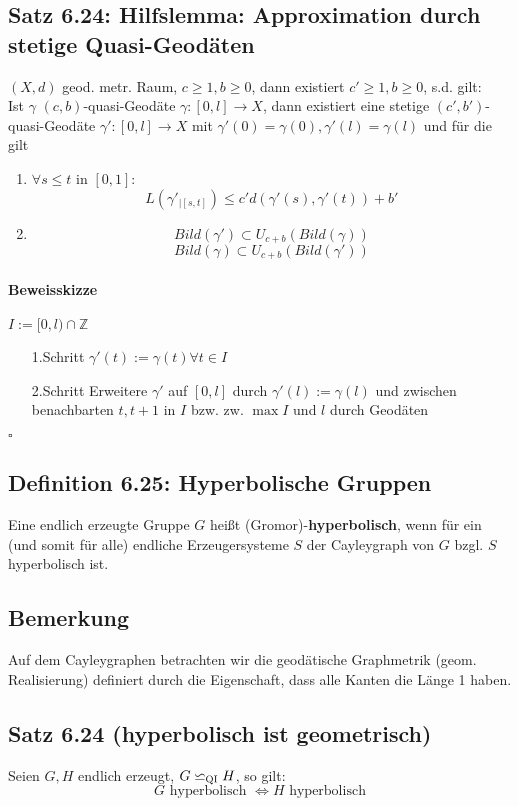\documentclass{article}
\newcommand{\df}[1]{\textbf{#1}\index{#1}}
\newcommand{\Z}{\mathbb{Z}}
\newcommand{\qed}{\hfill $\square$}
\newcommand{\qi}{\backsimeq_{\textsc{QI}}}
\begin{document}
\subsection{Satz 6.24: Hilfslemma: Approximation durch stetige Quasi-Geodäten}
$(X,d)$ geod. metr. Raum, $c \geq 1, b \geq 0$, dann existiert $c' \geq 1, b \geq 0$, s.d. gilt:\\
Ist $\gamma$ $(c,b)$-quasi-Geodäte $\gamma : [0,l] \rightarrow X$, dann existiert eine stetige $(c',b')$-quasi-Geodäte $\gamma' : [0,l] \rightarrow X$ mit $\gamma'(0) = \gamma(0), \gamma'(l) = \gamma(l)$ und für die gilt
\begin{enumerate}
	\item $\forall s \leq t $ in $[0,1]$:
	\[L(\gamma'_{|[s,t]}) \leq c'd(\gamma'(s) , \gamma'(t)) + b' \]
	\item 
	\[Bild(\gamma') \subset U_{c+ b}(Bild(\gamma))  \]
	\[Bild(\gamma) \subset U_{c+ b}(Bild(\gamma'))  \]
\end{enumerate}

\paragraph{Beweisskizze}
$I := [0,l) \cap \Z$
\begin{enumerate}
	\item[1.Schritt] $\gamma'(t) := \gamma(t) \forall t \in I$
	\item[2.Schritt] Erweitere $\gamma'$ auf $[0,l]$ durch $\gamma'(l) := \gamma(l)$ und zwischen benachbarten $t,t+1$ in $I$ bzw. zw. $\max I$ und $l$ durch Geodäten
	\end{enumerate}
\qed

\subsection{Definition 6.25: Hyperbolische Gruppen}
Eine endlich erzeugte Gruppe $G$ heißt (Gromor)-\df{hyperbolisch}, wenn für ein (und somit für alle) endliche Erzeugersysteme $S$ der Cayleygraph von $G$ bzgl. $S$ hyperbolisch ist.

\subsection{Bemerkung}
Auf dem Cayleygraphen betrachten wir die geodätische Graphmetrik (geom. Realisierung) definiert durch die Eigenschaft, dass alle Kanten die Länge 1 haben.

\subsection{Satz 6.24 (hyperbolisch ist geometrisch)}
Seien $G, H $ endlich erzeugt, $G \qi H$, so gilt:\\
\[G \text{ hyperbolisch } \Leftrightarrow H \text{ hyperbolisch} \]
\end{document}
